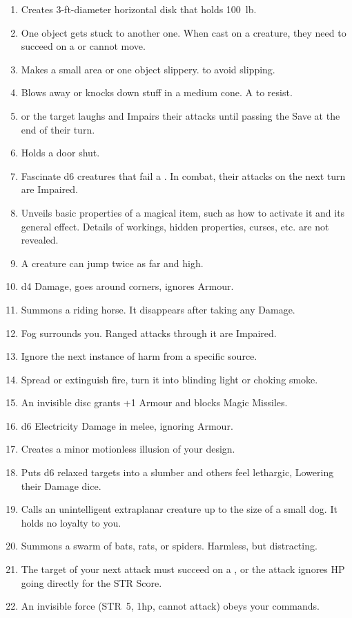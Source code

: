\documentclass[itdr]{subfiles}
\begin{document}
\begin{enumerate}
	\item {} Creates 3-ft-diameter horizontal disk that holds 100~lb.
	\item {} One object gets stuck to another one. When cast on a creature, they need to succeed on a  or cannot move.
	\item {} Makes a small area or one object slippery.  to avoid slipping.
	\item {} Blows away or knocks down stuff in a medium cone. A  to resist.
	\item {}  or the target laughs and Impairs their attacks until passing the Save at the end of their turn.
	\item {} Holds a door shut.
	\item {} Fascinate d6 creatures that fail a . In combat, their attacks on the next turn are Impaired.
	\item {} Unveils basic properties of a magical item, such as how to activate it and its general effect. Details of workings, hidden properties, curses, etc. are not revealed.
	\item {} A creature can jump twice as far and high.
	\item {} d4 Damage, goes around corners, ignores Armour.
	\item {} Summons a riding horse. It disappears after taking any Damage.
	\item {} Fog surrounds you. Ranged attacks through it are Impaired.
	\item {} Ignore the next instance of harm from a specific source.
	\item {} Spread or extinguish fire, turn it into blinding light or choking smoke.
	\item {} An invisible disc grants +1 Armour and blocks Magic Missiles.
	\item {} d6 Electricity Damage in melee, ignoring Armour.
	\item {} Creates a minor motionless \mbox{illusion} of your design.
	\item {} Puts d6 relaxed targets into a slumber and others feel lethargic, Lowering their \mbox{Damage} dice.
	\item {} Calls an unintelligent extraplanar creature up to the size of a small dog. It holds no loyalty to you.
	\item {} Summons a swarm of bats, rats, or spiders. Harmless, but distracting.
	\item {} The target of your next attack must succeed on a , or the attack ignores HP going directly for the STR Score.
	\item {} An invisible force (STR~5, 1hp, cannot attack) obeys your commands.
\end{enumerate}
\end{document}

